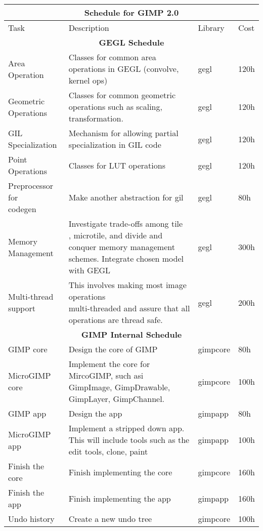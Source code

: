 \begin{flushleft}		
\begin{tabular}{|p{2cm}|p{5cm}|p{2cm}|l|}\hline
\multicolumn{4}{|c|}{\rule[-3mm]{0mm}{8mm} \large \bf Schedule for GIMP 2.0}\\  
\hline
Task & Description & Library & Cost\\ 
\hline 

\multicolumn{4}{|c|}{\bf GEGL Schedule}\\
\hline
Area Operation & Classes for common area operations in GEGL (convolve, kernel ops) & gegl & 120h\\
\hline
\raggedright{Geometric\\ Operations} & Classes for common geometric operations such as scaling, transformation. & gegl & 120h\\
\hline
GIL Specialization & Mechanism for allowing partial specialization in GIL code & gegl & 120h\\
\hline
Point Operations & Classes for LUT operations & gegl & 120h\\
\hline
\raggedright{Preprocessor for\\ codegen} & Make another abstraction for gil & gegl & 80h\\
\hline
\raggedright{Memory \\Management} & \raggedright{Investigate trade-offs among tile\\, microtile, and divide and conquer memory management schemes. Integrate chosen model with GEGL} & gegl & 300h\\
\hline
\raggedright{Multi-thread \\support} & \raggedright{This involves making most image operations \\multi-threaded and assure that all operations are thread safe.} & gegl & 200h\\  
\hline

\multicolumn{4}{|c|}{\bf GIMP Internal Schedule}\\
\hline 
GIMP core & Design the core of GIMP & gimpcore & 80h\\
\hline 
\raggedright{MicroGIMP\\ core} & \raggedright{Implement the core for MircoGIMP, such asi\\ GimpImage, GimpDrawable, GimpLayer, GimpChannel.} & gimpcore & 100h\\
\hline
GIMP app & Design the app & gimpapp & 80h\\
\hline 
\raggedright{MicroGIMP\\ app} & Implement a stripped down app. This will include tools such as the edit tools, clone, paint & gimpapp & 100h\\
\hline 
\raggedright{Finish the\\ core} & Finish implementing the core & gimpcore & 160h\\
\hline
\raggedright{Finish the \\app} & Finish implementing the app & gimpapp & 160h\\
\hline 
Undo history & Create a new undo tree & gimpcore & 100h\\
\hline
\end{tabular}


\end{flushleft}
